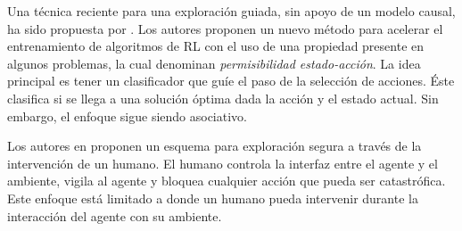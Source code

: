 Una técnica reciente para una exploración 
guiada, sin apoyo de un modelo causal, ha sido
propuesta por \cite{mazumder2019guided}.
Los autores proponen un nuevo método
para acelerar el entrenamiento de algoritmos de RL con el uso de una propiedad presente
en algunos problemas, la cual denominan \textit{permisibilidad estado-acción}.
La idea principal es tener un clasificador
que guíe el paso de la selección de acciones. Éste clasifica si se llega
a una solución óptima dada la acción y el
estado actual. Sin embargo, el enfoque sigue siendo
asociativo.

Los autores en \cite{saunders2017trial} proponen un esquema 
para exploración segura a través de la intervención de un humano. El humano controla la interfaz entre el agente y el ambiente, vigila
al agente y bloquea cualquier acción que pueda ser catastrófica. Este enfoque
está limitado a donde un humano pueda intervenir durante la interacción 
del agente con su ambiente.



